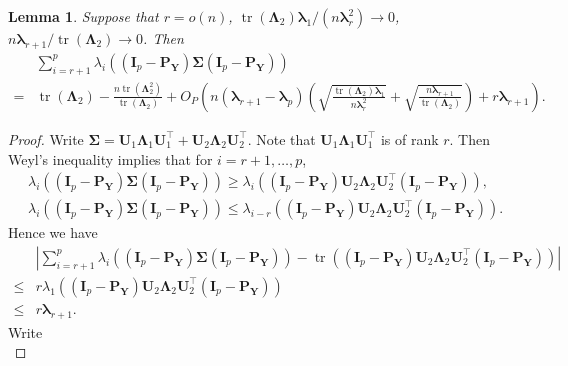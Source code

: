 \documentclass[12pt]{article} %
\DeclareMathOperator{\mytr}{tr}
\newcommand{\bP}{\mathbf{P}}
\newcommand{\bY}{\mathbf{Y}}
\newcommand{\bI}{\mathbf{I}}
\newcommand{\bU}{\mathbf{U}}
\newcommand{\bfsym}[1]{\ensuremath{\boldsymbol{#1}}}
\def\blambda {\bfsym {\lambda}}
\def\bLambda {\bfsym {\Lambda}}
\def\bSigma {\bfsym {\Sigma}}
\newtheorem{lemma}{Lemma}
\theoremstyle{definition}
\begin{document}
\begin{appendices}
\begin{lemma}\label{gg:Lemmac}
    Suppose that
    $r=o(n)$, $\mytr(\bLambda_2)\blambda_1/(n\blambda_r^2)\to 0$,
    $n\blambda_{r+1}/\mytr(\bLambda_2)\to 0$.
    Then
\begin{equation*}
    \begin{split}
        &
        \sum_{i=r+1}^{p}\lambda_i\left(
         (\bI_p -\bP_\bY)\bSigma (\bI_p- \bP_{\bY})
    \right)
    \\
    =&\mytr(\bLambda_2)-\frac{n\mytr(\bLambda_2^2)}{\mytr(\bLambda_2)}
    +
    O_P\left(n(\blambda_{r+1}-\blambda_p)\left(\sqrt{\frac{\mytr(\bLambda_2)\blambda_1}{n\blambda_r^2}}+\sqrt{\frac{n\blambda_{r+1}}{\mytr(\bLambda_2)}}\right)
    +r\blambda_{r+1}
    \right).
    \end{split}
\end{equation*}
\end{lemma}
\begin{proof}
    Write $\bSigma=\bU_1 \bLambda_1 \bU_1^\top+\bU_2 \bLambda_2 \bU_2^\top$.
    Note that $\bU_1 \bLambda_1 \bU_1^\top$ is of rank $r$.
    Then Weyl's inequality implies that for $i=r+1,\ldots,p$, 
    \begin{align}
        \label{yanyan1}
    &\lambda_i \left(
         (\bI_p -\bP_\bY)\bSigma (\bI_p- \bP_{\bY})
    \right)
    \geq
    \lambda_i \left(
         (\bI_p -\bP_\bY)\bU_2 \bLambda_2 \bU_2^\top (\bI_p- \bP_{\bY})
     \right),
     \\
     \label{yanyan2}
     &
    \lambda_i \left(
         (\bI_p -\bP_\bY)\bSigma (\bI_p- \bP_{\bY})
    \right)
    \leq
    \lambda_{i-r} \left(
         (\bI_p -\bP_\bY)\bU_2 \bLambda_2 \bU_2^\top (\bI_p- \bP_{\bY})
     \right).
    \end{align}
    Hence we have
    \begin{equation}\label{jojo2}
        \begin{split}
        &\left|
        \sum_{i=r+1}^{p}\lambda_i\left(
         (\bI_p -\bP_\bY)\bSigma (\bI_p- \bP_{\bY})
    \right)
    -
        \mytr\left(
         (\bI_p -\bP_\bY)\bU_2 \bLambda_2 \bU_2^\top (\bI_p- \bP_{\bY})
    \right)
    \right|
    \\
    \leq&
    r\lambda_1 \left(
         (\bI_p -\bP_\bY)\bU_2 \bLambda_2 \bU_2^\top (\bI_p- \bP_{\bY})
    \right)
    \\
    \leq & r \blambda_{r+1}.
        \end{split}
    \end{equation}
    Write
    \begin{equation}\label{jojoa}

\end{equation}
\end{proof}
\end{appendices}
\end{document}
